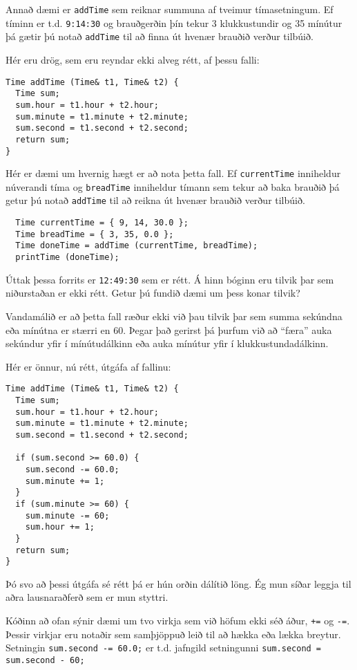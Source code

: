 Annað dæmi er {\tt addTime} sem reiknar summuna af tveimur tímasetningum.
Ef tíminn er t.d. {\tt 9:14:30} og brauðgerðin þín tekur 3 klukkustundir og 35 mínútur þá gætir þú notað {\tt addTime} til að finna út hvenær brauðið verður tilbúið.

Hér eru drög, sem eru reyndar ekki alveg rétt, af þessu falli:

\begin{verbatim}
Time addTime (Time& t1, Time& t2) {
  Time sum;
  sum.hour = t1.hour + t2.hour;
  sum.minute = t1.minute + t2.minute;
  sum.second = t1.second + t2.second;
  return sum;
}
\end{verbatim}
%
Hér er dæmi um hvernig hægt er að nota þetta fall.
Ef {\tt currentTime} inniheldur núverandi tíma og {\tt breadTime} inniheldur tímann sem tekur að baka brauðið þá getur þú notað {\tt addTime} til að reikna út hvenær brauðið verður tilbúið.

\begin{verbatim}
  Time currentTime = { 9, 14, 30.0 };
  Time breadTime = { 3, 35, 0.0 };
  Time doneTime = addTime (currentTime, breadTime);
  printTime (doneTime);
\end{verbatim}
%
Úttak þessa forrits er {\tt 12:49:30} sem er rétt.
Á hinn bóginn eru tilvik þar sem niðurstaðan er ekki rétt.
Getur þú fundið dæmi um þess konar tilvik?

Vandamálið er að þetta fall ræður ekki við þau tilvik þar sem summa sekúndna eða mínútna er stærri en 60.
Þegar það gerirst þá þurfum við að ``færa'' auka sekúndur yfir í mínútudálkinn eða auka mínútur yfir í klukkustundadálkinn.

Hér er önnur, nú rétt, útgáfa af fallinu:

\begin{verbatim}
Time addTime (Time& t1, Time& t2) {
  Time sum;
  sum.hour = t1.hour + t2.hour;
  sum.minute = t1.minute + t2.minute;
  sum.second = t1.second + t2.second;

  if (sum.second >= 60.0) {
    sum.second -= 60.0;
    sum.minute += 1;
  }
  if (sum.minute >= 60) {
    sum.minute -= 60;
    sum.hour += 1;
  }
  return sum;
}
\end{verbatim}
%
Þó svo að þessi útgáfa sé rétt þá er hún orðin dálítið löng.
Ég mun síðar leggja til aðra lausnaraðferð sem er mun styttri.


Kóðinn að ofan sýnir dæmi um tvo virkja sem við höfum ekki séð áður, {\tt +=} og {\tt -=}.
Þessir virkjar eru notaðir sem samþjöppuð leið til að hækka eða lækka breytur.
Setningin {\tt sum.second -= 60.0;} er t.d. jafngild setningunni {\tt sum.second = sum.second - 60;}

